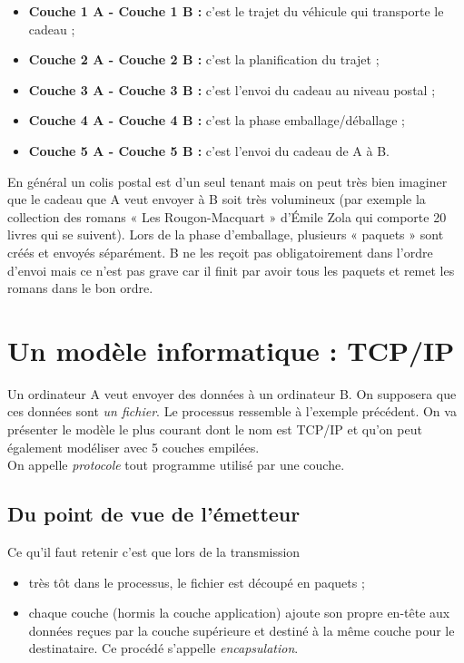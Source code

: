 \begin{itemize}
    \item 	\textbf{Couche 1 A - Couche 1 B :} c'est le trajet du véhicule qui transporte le cadeau ;
    \item 	\textbf{Couche 2 A - Couche 2 B :} c'est la planification du trajet ;
    \item 	\textbf{Couche 3 A - Couche 3 B :} c'est l'envoi du cadeau au niveau postal ;
    \item 	\textbf{Couche 4 A - Couche 4 B :} c'est la phase emballage/déballage ;
    \item 	\textbf{Couche 5 A - Couche 5 B :} c'est l'envoi du cadeau de A à B.
\end{itemize}


En général un colis postal est d'un seul tenant mais on peut très bien imaginer que le cadeau que A veut envoyer à B soit très volumineux (par exemple la collection des  romans « Les Rougon-Macquart » d'\'Emile Zola qui comporte 20 livres qui se suivent). Lors de la phase d'emballage, plusieurs « paquets » sont créés et envoyés séparément. B ne les reçoit pas obligatoirement dans l'ordre d'envoi mais ce n'est pas grave car il finit par avoir tous les paquets et remet les romans dans le bon ordre.

\section{Un modèle informatique : TCP/IP}


Un ordinateur A veut envoyer des données à un ordinateur B. On supposera que ces données sont \textit{un fichier}. Le processus ressemble à l'exemple précédent. On va présenter le modèle le plus courant dont le nom est TCP/IP et qu'on peut également modéliser avec 5 couches empilées.\\
On appelle \textit{protocole} tout programme utilisé par une couche.\\

\subsection{Du point de vue de l'émetteur}

Ce qu'il faut retenir c'est que lors de la transmission
\begin{itemize}
    \item 	très tôt dans le processus, le fichier est découpé en paquets ;
    \item 	chaque couche (hormis la couche application) ajoute son propre en-tête aux données reçues par la couche supérieure et destiné à la même couche pour le destinataire. Ce procédé s'appelle \textit{encapsulation}.
\end{itemize}

